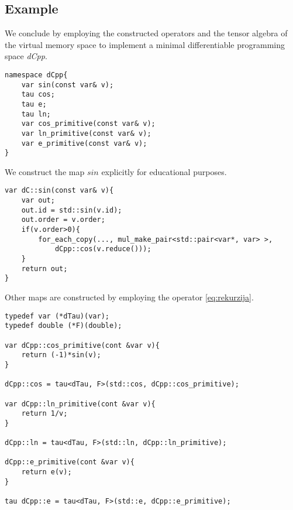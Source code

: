 \subsection{Example}

We conclude by employing the constructed operators and the tensor algebra of the virtual memory space to implement a minimal differentiable programming space \emph{dCpp}.

\begin{lstlisting}
namespace dCpp{
    var sin(const var& v);
    tau cos;
    tau e;
    tau ln;
    var cos_primitive(const var& v);
    var ln_primitive(const var& v);
    var e_primitive(const var& v);
}
\end{lstlisting}

\noindent We construct the map $sin$ explicitly for educational purposes.

\begin{lstlisting}
var dC::sin(const var& v){
    var out;
    out.id = std::sin(v.id);
    out.order = v.order;
    if(v.order>0){
    	for_each_copy(..., mul_make_pair<std::pair<var*, var> >,
    		dCpp::cos(v.reduce()));
    }
    return out;
}
\end{lstlisting}
Other maps are constructed by employing the operator \eqref{eq:rekurzija}.
\begin{lstlisting}
typedef var (*dTau)(var);
typedef double (*F)(double);

var dCpp::cos_primitive(cont &var v){
    return (-1)*sin(v);
}

dCpp::cos = tau<dTau, F>(std::cos, dCpp::cos_primitive);

var dCpp::ln_primitive(cont &var v){
    return 1/v;
}

dCpp::ln = tau<dTau, F>(std::ln, dCpp::ln_primitive);

dCpp::e_primitive(cont &var v){
    return e(v);
}

tau dCpp::e = tau<dTau, F>(std::e, dCpp::e_primitive);

\end{lstlisting}
